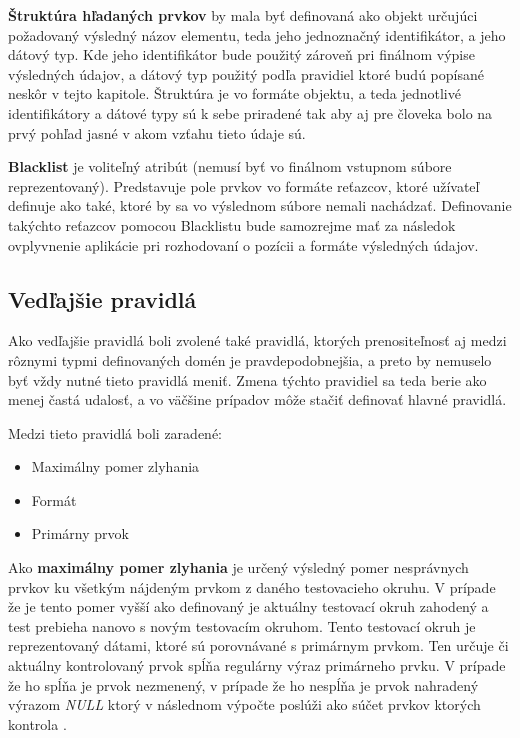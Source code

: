 \bigskip

\textbf{Štruktúra hľadaných prvkov} by mala byť definovaná ako objekt určujúci požadovaný výsledný názov elementu, teda jeho jednoznačný identifikátor, a jeho  dátový typ. Kde jeho identifikátor bude použitý zároveň pri finálnom výpise výsledných údajov, a dátový typ použitý podľa pravidiel ktoré budú popísané neskôr v tejto kapitole. Štruktúra je vo formáte objektu, a teda jednotlivé identifikátory a dátové typy sú k sebe priradené tak aby aj pre človeka bolo na prvý pohľad jasné v akom vzťahu tieto údaje sú.

\bigskip

\textbf{Blacklist} je voliteľný atribút (nemusí byť vo finálnom vstupnom súbore reprezentovaný). Predstavuje pole prvkov vo formáte reťazcov, ktoré užívateľ definuje ako také, ktoré by sa vo výslednom súbore nemali nachádzať. Definovanie takýchto reťazcov pomocou Blacklistu bude samozrejme mať za následok ovplyvnenie aplikácie pri rozhodovaní o pozícii a formáte výsledných údajov. 

\newpage
\subsection{Vedľajšie pravidlá}

Ako vedľajšie pravidlá boli zvolené také pravidlá, ktorých prenositeľnosť aj medzi rôznymi typmi definovaných domén je pravdepodobnejšia, a preto by nemuselo byť vždy nutné tieto pravidlá meniť. Zmena týchto pravidiel sa teda berie ako menej častá udalosť, a vo väčšine prípadov môže stačiť definovať hlavné pravidlá. 

Medzi tieto pravidlá boli zaradené:
\begin{itemize}
    \item {Maximálny pomer zlyhania}
    \item {Formát}
    \item {Primárny prvok}
\end{itemize}

\bigskip

Ako \textbf{maximálny pomer zlyhania} je určený výsledný pomer nesprávnych prvkov ku všetkým nájdeným prvkom z daného testovacieho okruhu. V prípade že je tento pomer vyšší ako definovaný je aktuálny testovací okruh zahodený a test prebieha nanovo s novým testovacím okruhom. Tento testovací okruh je reprezentovaný dátami, ktoré sú porovnávané s primárnym prvkom. Ten určuje či aktuálny kontrolovaný prvok spĺňa regulárny výraz primárneho prvku. V prípade že ho spĺňa je prvok nezmenený, v prípade že ho nespĺňa je prvok nahradený výrazom \textit{NULL} ktorý v následnom výpočte poslúži ako súčet prvkov ktorých kontrola . 

